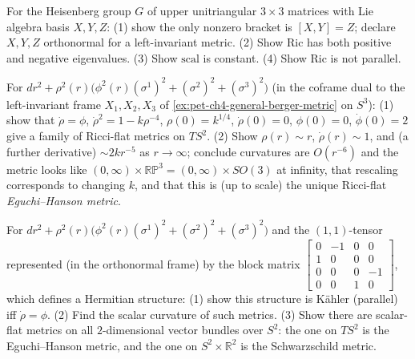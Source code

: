 \begin{remark}
  \label{rem:pet-ch4-ex-22}

  For the Heisenberg group $G$ of upper unitriangular $3\times3$ matrices with
  Lie algebra basis $X,Y,Z$: (1) show the only nonzero bracket is $[X,Y]=Z$;
  declare $X,Y,Z$ orthonormal for a left-invariant metric. (2) Show
  $\mathrm{Ric}$ has both positive and negative eigenvalues. (3) Show
  $\mathrm{scal}$ is constant. (4) Show $\mathrm{Ric}$ is not parallel.
\end{remark}

\begin{remark}
  \label{rem:pet-ch4-ex-23}

  For $dr^2+\rho^2(r)\big(\phi^2(r)(\sigma^1)^2+(\sigma^2)^2+(\sigma^3)^2\big)$
  (in the coframe dual to the left-invariant frame $X_1,X_2,X_3$ of
  \cref{ex:pet-ch4-general-berger-metric} on $S^3$):
  (1) show that $\dot\rho=\phi$, $\dot\rho^2=1-k\rho^{-4}$,
  $\rho(0)=k^{1/4}$, $\dot\rho(0)=0$, $\phi(0)=0$, $\dot\phi(0)=2$ give a family
  of Ricci-flat metrics on $TS^2$. (2) Show $\rho(r)\sim r$, $\dot\rho(r)\sim1$,
  and (a further derivative) $\sim2kr^{-5}$ as $r\to\infty$; conclude
  curvatures are $O(r^{-6})$ and the metric looks like
  $(0,\infty)\times\mathbb{RP}^3=(0,\infty)\times SO(3)$ at infinity, that
  rescaling corresponds to changing $k$, and that this is (up to scale) the
  unique Ricci-flat \emph{Eguchi--Hanson metric}.
\end{remark}

\begin{remark}
  \label{rem:pet-ch4-ex-24}

  For $dr^2+\rho^2(r)\big(\phi^2(r)(\sigma^1)^2+(\sigma^2)^2+(\sigma^3)^2\big)$
  and the $(1,1)$-tensor represented (in the orthonormal frame) by the block
  matrix $\left[\begin{smallmatrix}0&-1&0&0\\1&0&0&0\\0&0&0&-1\\0&0&1&0\end{smallmatrix}\right]$,
  which defines a Hermitian structure: (1) show this structure is Kähler
  (parallel) iff $\dot\rho=\phi$. (2) Find the scalar curvature of such
  metrics. (3) Show there are scalar-flat metrics on all $2$-dimensional
  vector bundles over $S^2$: the one on $TS^2$ is the Eguchi--Hanson metric,
  and the one on $S^2\times\mathbb{R}^2$ is the Schwarzschild metric.
\end{remark}


